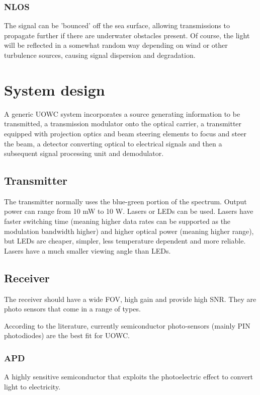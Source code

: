 \documentclass{article}
\begin{document}
\subsubsection{\ac{NLOS}}
The signal can be 'bounced' off the sea surface, allowing transmissions to
propagate further if there are underwater obstacles present. Of course, the
light will be reflected in a somewhat random way depending on wind or other
turbulence sources, causing signal dispersion and degradation.


\section{System design}
A generic \ac{UOWC} system incorporates a source generating information to be
transmitted, a transmission modulator onto the optical carrier, a transmitter
equipped with projection optics and beam steering elements to focus and steer
the beam, a detector converting optical to electrical signals and then a
subsequent signal processing unit and demodulator.

\subsection{Transmitter}
The transmitter normally uses the blue-green portion of the spectrum.
Output power can range from 10 mW to 10 W. Lasers or \ac{LED}s can be used.
Lasers have faster switching time (meaning higher data rates can be supported
as the modulation bandwidth higher) and higher optical power (meaning higher
range), but \ac{LED}s are cheaper, simpler, less temperature dependent and
more reliable. Lasers have a much smaller viewing angle than \ac{LED}s.

\subsection{Receiver}
The receiver should have a wide \ac{FOV}, high gain and provide high \ac{SNR}.
They are photo sensors that come in a range of types.

According to the literature, currently semiconductor photo-sensors (mainly
\ac{PIN} photodiodes) are the best fit for \ac{UOWC}.

\subsubsection{\ac{APD}}
A highly sensitive semiconductor that exploits the photoelectric effect to
convert light to electricity.
\end{document}
